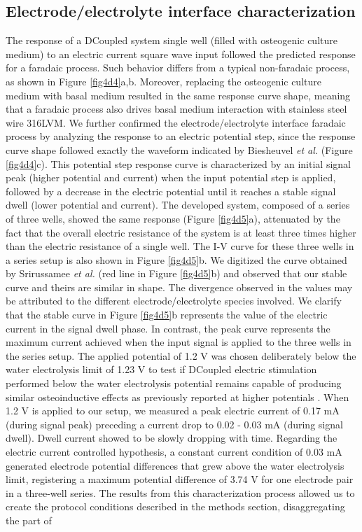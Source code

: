 \subsection{Electrode/electrolyte interface characterization}
The response of a DCoupled system single well (filled with osteogenic culture medium) to an electric current square wave input followed the predicted response for a faradaic process. Such behavior differs from a typical non-faradaic process, as shown in Figure \ref{fig4d4}a,b. Moreover, replacing the osteogenic culture medium with basal medium resulted in the same response curve shape, meaning that a faradaic process also drives basal medium interaction with stainless steel wire 316LVM. We further confirmed the electrode/electrolyte interface faradaic process by analyzing the response to an electric potential step, since the response curve shape followed exactly the waveform indicated by Biesheuvel \textit{et al.} \cite{Biesheuvel2018-wu} (Figure \ref{fig4d4}c). This potential step response curve is characterized by an initial signal peak (higher potential and current) when the input potential step is applied, followed by a decrease in the electric potential until it reaches a stable signal dwell (lower potential and current). The developed system, composed of a series of three wells, showed the same response (Figure \ref{fig4d5}a), attenuated by the fact that the overall electric resistance of the system is at least three times higher than the electric resistance of a single well. The I-V curve for these three wells in a series setup is also shown in Figure \ref{fig4d5}b. We digitized the curve obtained by Srirussamee \textit{et al.} \cite{Srirussamee2021-cj} (red line in Figure \ref{fig4d5}b) and observed that our stable curve and theirs are similar in shape. The divergence observed in the values may be attributed to the different electrode/electrolyte species involved. We clarify that the stable curve in Figure \ref{fig4d5}b represents the value of the electric current in the signal dwell phase. In contrast, the peak curve represents the maximum current achieved when the input signal is applied to the three wells in the series setup. The applied potential of 1.2 \si{\volt} was chosen deliberately below the water electrolysis limit of 1.23 \si{\volt} \cite{Guette-Marquet2021-rp} to test if DCoupled electric stimulation performed below the water electrolysis potential remains capable of producing similar osteoinductive effects as previously reported at higher potentials \cite{Mobini2017-wp, Mobini2017-zr, Leppik2018-bw}. When 1.2 \si{\volt} is applied to our setup, we measured a peak electric current of 0.17 \si{\milli\ampere} (during signal peak) preceding a current drop to 0.02 - 0.03 \si{\milli\ampere} (during signal dwell). Dwell current showed to be slowly dropping with time. Regarding the electric current controlled hypothesis, a constant current condition of 0.03 \si{\milli\ampere} generated electrode potential differences that grew above the water electrolysis limit, registering a maximum potential difference of 3.74 \si{\volt} for one electrode pair in a three-well series. The results from this characterization process allowed us to create the protocol conditions described in the methods section, disaggregating the part of 